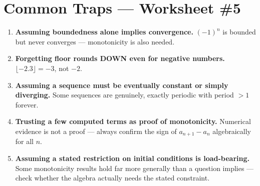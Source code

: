\documentclass[11pt,a4paper]{article}
\begin{document}
\section*{Common Traps --- Worksheet \#5}
\begin{enumerate}[leftmargin=2em,itemsep=4pt]
  \item \textbf{Assuming boundedness alone implies convergence.} $(-1)^n$ is bounded but never converges --- monotonicity is also needed. 
  \item \textbf{Forgetting floor rounds DOWN even for negative numbers.} $\lfloor-2.3\rfloor=-3$, not $-2$. 
  \item \textbf{Assuming a sequence must be eventually constant or simply diverging.} Some sequences are genuinely, exactly periodic with period $>1$ forever. 
  \item \textbf{Trusting a few computed terms as proof of monotonicity.} Numerical evidence is not a proof --- always confirm the sign of $a_{n+1}-a_n$ algebraically for all $n$. 
  \item \textbf{Assuming a stated restriction on initial conditions is load-bearing.} Some monotonicity results hold far more generally than a question implies --- check whether the algebra actually needs the stated constraint. 
\end{enumerate}

\end{document}
